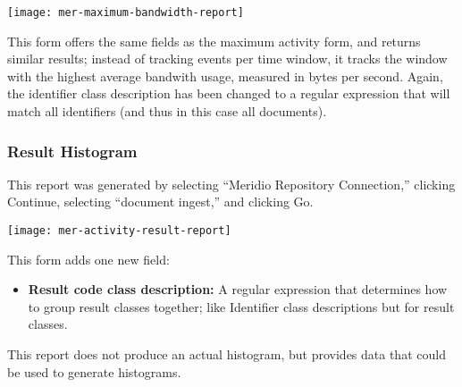 \begin{changemargin}{1.5in}{0in}
\texttt{[image: mer-maximum-bandwidth-report]}

This form offers the same fields as the maximum activity form, and
returns similar results; instead of tracking events per time window,
it tracks the window with the highest average bandwith usage, measured
in bytes per second. Again, the identifier class description has been
changed to a regular expression that will match all identifiers (and
thus in this case all documents).

\subsubsection{Result Histogram}

This report was generated by selecting ``Meridio Repository
Connection,'' clicking Continue, selecting ``document ingest,'' and
clicking Go.

\texttt{[image: mer-activity-result-report]}

This form adds one new field:

\begin{itemize}

\item \textbf{Result code class description:} A regular expression that
determines how to group result classes together; like Identifier class
descriptions but for result classes.

\end{itemize}

This report does not produce an actual histogram, but provides data that
could be used to generate histograms.  
 
\end{changemargin}
